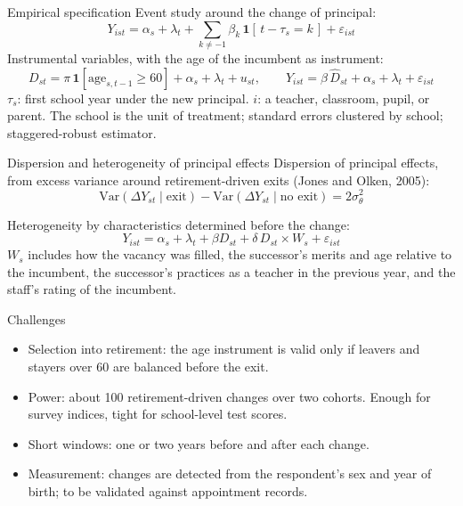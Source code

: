 \documentclass[aspectratio=169,11pt]{beamer}
\newcommand{\cit}[1]{{\color{cite}\small(#1)}}
\begin{document}
\begin{frame}{Empirical specification}
\vspace{0.3cm}
Event study around the change of principal:
\begin{equation*}
Y_{ist}=\alpha_s+\lambda_t+\sum_{k\neq -1}\beta_k\,\mathbf{1}[\,t-\tau_s=k\,]+\varepsilon_{ist}
\end{equation*}
\vspace{0.1cm}
Instrumental variables, with the age of the incumbent as instrument:
\begin{equation*}
D_{st}=\pi\,\mathbf{1}[\text{age}_{s,t-1}\ge 60]+\alpha_s+\lambda_t+u_{st},\qquad
Y_{ist}=\beta\,\widehat{D}_{st}+\alpha_s+\lambda_t+\varepsilon_{ist}
\end{equation*}
\vspace{0.2cm}
{\small $\tau_s$: first school year under the new principal. $i$: a teacher, classroom, pupil, or parent. The school is the unit of treatment; standard errors clustered by school; staggered-robust estimator.}
\end{frame}

\begin{frame}{Dispersion and heterogeneity of principal effects}
\vspace{0.2cm}
\noindent Dispersion of principal effects, from excess variance around retirement-driven exits \cit{Jones and Olken, 2005}:
\begin{equation*}
\mathrm{Var}(\Delta Y_{st}\mid \text{exit})-\mathrm{Var}(\Delta Y_{st}\mid \text{no exit})=2\sigma^2_{\theta}
\end{equation*}
\vspace{-0.1cm}
\par\noindent Heterogeneity by characteristics determined before the change:
\begin{equation*}
Y_{ist}=\alpha_s+\lambda_t+\beta D_{st}+\delta\,D_{st}\times W_s+\varepsilon_{ist}
\end{equation*}
\vspace{0.1cm}
{\small $W_s$ includes how the vacancy was filled, the successor's merits and age relative to the incumbent, the successor's practices as a teacher in the previous year, and the staff's rating of the incumbent.}
\end{frame}

\begin{frame}{Challenges}
\vspace{0.4cm}
\begin{itemize}\setlength{\itemsep}{1.1em}
\item Selection into retirement: the age instrument is valid only if leavers and stayers over 60 are balanced before the exit.
\item Power: about 100 retirement-driven changes over two cohorts. Enough for survey indices, tight for school-level test scores.
\item Short windows: one or two years before and after each change.
\item Measurement: changes are detected from the respondent's sex and year of birth; to be validated against appointment records.
\end{itemize}
\end{frame}
\end{document}
